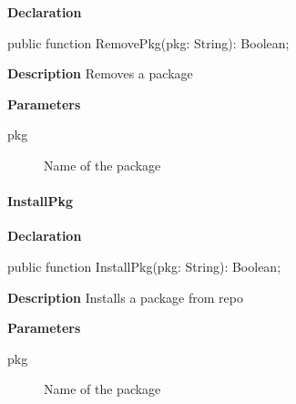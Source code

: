 \documentclass{report}
\newif\ifpdf
\begin{document}
\label{packagekit.TPackageKit-RemovePkg}
\begin{list}{}{
\setlength{\itemindent}{0cm}
\setlength{\listparindent}{0cm}
\setlength{\leftmargin}{\evensidemargin}
\addtolength{\leftmargin}{\tmplength}
\settowidth{\labelsep}{X}
\addtolength{\leftmargin}{\labelsep}
\setlength{\labelwidth}{\tmplength}
}
\item[\textbf{Declaration}\hfill]
\ifpdf
\begin{flushleft}
\fi
\begin{ttfamily}
public function RemovePkg(pkg: String): Boolean;\end{ttfamily}

\ifpdf
\end{flushleft}
\fi

\par
\item[\textbf{Description}]
Removes a package \par
\item[\textbf{Parameters}]
\begin{description}
\item[pkg] Name of the package
\end{description}


\end{list}
\paragraph*{InstallPkg}\hspace*{\fill}

\label{packagekit.TPackageKit-InstallPkg}
\begin{list}{}{
\setlength{\itemindent}{0cm}
\setlength{\listparindent}{0cm}
\setlength{\leftmargin}{\evensidemargin}
\addtolength{\leftmargin}{\tmplength}
\settowidth{\labelsep}{X}
\addtolength{\leftmargin}{\labelsep}
\setlength{\labelwidth}{\tmplength}
}
\item[\textbf{Declaration}\hfill]
\ifpdf
\begin{flushleft}
\fi
\begin{ttfamily}
public function InstallPkg(pkg: String): Boolean;\end{ttfamily}

\ifpdf
\end{flushleft}
\fi

\par
\item[\textbf{Description}]
Installs a package from repo \par
\item[\textbf{Parameters}]
\begin{description}
\item[pkg] Name of the package
\end{description}


\end{list}
\end{document}
